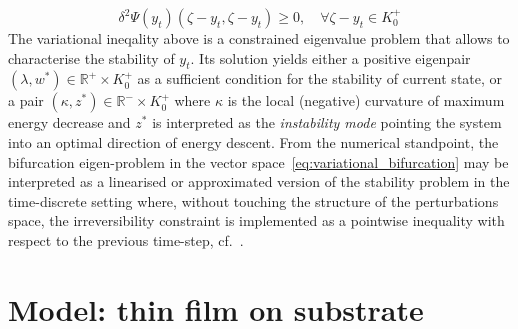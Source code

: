 \begin{equation}
     \label{eq:variational_stability}
     \delta^2 \Psi(y_t)(\zeta - y_t,  \zeta - y_t)  \geq 0, \quad \forall \zeta-y_t \in K^+_{0}
 \end{equation}
The variational ineqality above is a constrained eigenvalue problem that allows to characterise the stability of $y_t$. Its solution yields either a positive eigenpair $(\lambda, w^*)\in \mathbb{R}^+\times K^+_0$ as a sufficient condition for the stability of current state, or a pair $(\kappa, z^*)\in \mathbb{R}^-\times K^+_0$ where $\kappa$ is the local (negative) curvature of maximum energy decrease and $z^*$ is interpreted as the \emph{instability mode} pointing the system into an optimal direction of energy descent. 
From the numerical standpoint, the bifurcation eigen-problem in the vector space~\eqref{eq:variational_bifurcation} may be interpreted as a linearised or approximated version of the stability problem in the time-discrete setting where, without touching the structure of the perturbations space, the irreversibility constraint is implemented as a pointwise inequality with respect to the previous time-step, cf.~\cite{Baldelli2021-gc}.


\section{Model: thin film  on   substrate }
\label{sec:non-rigid}

